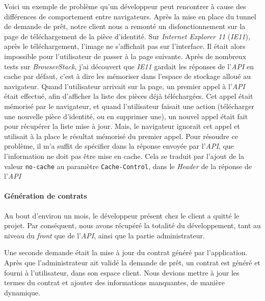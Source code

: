 \documentclass[12pt,a4paper]{article}
\begin{document}
  Voici un exemple de problème qu'un développeur peut rencontrer à cause
  des différences de comportement entre navigateurs. Après la mise en
  place du tunnel de demande de prêt, notre client nous a remonté un
  disfonctionnement sur la page de téléchargement de la pièce d'identité.
  Sur \emph{Internet Explorer 11} (\emph{IE11}), après le téléchargement,
  l'image ne s'affichait pas sur l'interface. Il était alors impossible
  pour l'utilisateur de passer à la page suivante. Après de nombreux tests
  sur \emph{BrowserStack}, j'ai découvert que \emph{IE11} gardait les
  réponses de l'\emph{API} en cache par défaut, c'est à dire les mémoriser
  dans l'espace de stockage alloué au navigateur. Quand l'utilisateur
  arrivait sur la page, un premier appel à l'\emph{API} était effectué,
  afin d'afficher la liste des pièces déjà téléchargées. Cet appel était
  mémorisé par le navigateur, et quand l'utilisateur faisait une action
  (télécharger une nouvelle pièce d'identité, ou en supprimer une), un
  nouvel appel était fait pour récupérer la liste mise à jour. Mais, le
  navigateur ignorait cet appel et utilisait à la place le résultat
  mémorisé du premier appel. Pour résoudre ce problème, il m'a suffit de
  spécifier dans la réponse envoyée par l'\emph{API}, que l'information ne
  doit pas être mise en cache. Cela se traduit par l'ajout de la valeur
  \texttt{no-cache} au paramètre \texttt{Cache-Control}, dans le
  \emph{Header} de la réponse de l'\emph{API}

  \bigskip

  \paragraph{Génération de contrats}\label{guxe9nuxe9ration-de-contrats}

  Au bout d'environ un mois, le développeur présent chez le client a
  quitté le projet. Par conséquent, nous avons récupéré la totalité du
  développement, tant au niveau du \emph{front} que de l'\emph{API}, ainsi
  que la partie administrateur.

  \bigskip

  Une seconde demande était la mise à jour du contrat généré par
  l'application. Après que l'administrateur ait validé la demande de prêt,
  un contrat est généré et fourni à l'utilisateur, dans son espace client.
  Nous devions mettre à jour les termes du contrat et ajouter des
  informations manquantes, de manière dynamique.

  \bigskip
\end{document}
